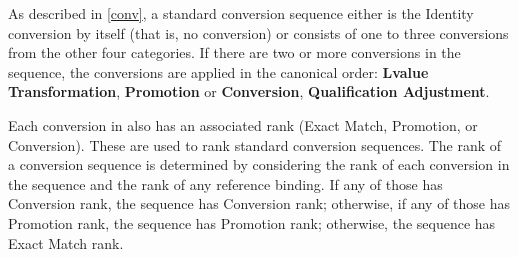 \pnum
\begin{note}
As described in \ref{conv},
a standard conversion sequence either is the Identity conversion
by itself (that is, no conversion) or consists of one to three
conversions from the other
four categories.
If there are two or more conversions in the sequence, the
conversions are applied in the canonical order:
\textbf{Lvalue Transformation},
\textbf{Promotion}
or
\textbf{Conversion},
\textbf{Qualification Adjustment}.
\end{note}

\pnum
{}%
Each conversion in 
also has an associated rank (Exact
Match, Promotion, or Conversion).
These are used
to rank standard conversion sequences.
The rank of a conversion sequence is determined by considering the
rank of each conversion in the sequence and the rank of any reference
binding.
If any of those has Conversion rank, the
sequence has Conversion rank; otherwise, if any of those has Promotion rank,
the sequence has Promotion rank; otherwise, the sequence has Exact
Match rank.

